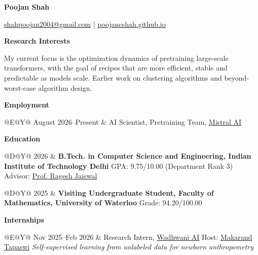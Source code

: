 \documentclass[11pt,letterpaper]{article}
\makeatletter
\newcommand{\cvsection}[1]{%
  \par\needspace{2.5\baselineskip}%
  \vspace{0.45\baselineskip}%
  {\large\bfseries\color{HeadingBlack} #1}\par
  \vspace{0.20\baselineskip}%
}
\newcommand{\datedentry}[2]{%
  \begin{tabularx}{\textwidth}{@{}D@{\hspace{0.08in}}Y@{}}
    \textcolor{DateSlate}{#1} & #2
  \end{tabularx}\par\vspace{0.16\baselineskip}%
}
\newcommand{\experience}[2]{%
  \begin{tabularx}{\textwidth}{@{}E@{\hspace{0.12in}}Y@{}}
    \textcolor{DateSlate}{#1} & #2
  \end{tabularx}\par\vspace{0.16\baselineskip}%
}
\newcommand{\contacticon}[3]{%
  \href{#1}{\textcolor{#2}{\raisebox{-0.08em}{\Large #3}}}%
}
\newcommand{\xicon}{\raisebox{0.04em}{\sffamily\bfseries X}}
\makeatother
\begin{document}
\begin{center}
  {\huge\bfseries Poojan Shah}\par
  \vspace{0.14\baselineskip}
  \href{mailto:shahpoojan2004@gmail.com}{\faEnvelope\enspace shahpoojan2004@gmail.com}
  \quad|\quad
  \href{https://poojancshah.github.io/}{\faHome\enspace poojancshah.github.io}
  \par
  \vspace{0.18\baselineskip}
  \contacticon{https://scholar.google.ca/citations?user=uedBN20AAAAJ}{ScholarBlue}{\aiGoogleScholar}
  \qquad
  \contacticon{https://github.com/PoojanCShah/}{GitHubBlack}{\faGithub}
  \qquad
  \contacticon{https://linkedin.com/in/poojan-shah-b077ab25b/}{LinkedInBlue}{\faLinkedinIn}
  \qquad
  \contacticon{https://x.com/PoojanShah6380}{XBlack}{\xicon}
\end{center}
\vspace{-0.20\baselineskip}

\cvsection{Research Interests}

My current focus is the optimization dynamics of pretraining large-scale
transformers, with the goal of recipes that are more efficient, stable and
predictable as models scale. Earlier work on clustering algorithms and
beyond-worst-case algorithm design.

\cvsection{Employment}

\experience{August 2026--Present}{%
AI Scientist, Pretraining Team, \href{https://mistral.ai/}{Mistral AI}
}

\cvsection{Education}

\datedentry{2026}{%
  \textbf{B.Tech. in Computer Science and Engineering, Indian Institute of Technology Delhi}\newline
  GPA: 9.75/10.00 (Department Rank 3) \quad Advisor: \href{https://www.cse.iitd.ac.in/~rjaiswal/}{Prof. Ragesh Jaiswal}
}

\datedentry{2025}{%
  \textbf{Visiting Undergraduate Student, Faculty of Mathematics, University of Waterloo}\newline
  Grade: 94.20/100.00
}

\cvsection{Internships}

\experience{Nov 2025--Feb 2026}{%
  Research Intern, \href{https://www.wadhwaniai.org/}{Wadhwani AI}\newline
  Host: \href{https://makarandtapaswi.github.io/}{Makarand Tapaswi}\newline
  \emph{Self-supervised learning from unlabeled data for newborn anthropometry}
}
\end{document}

